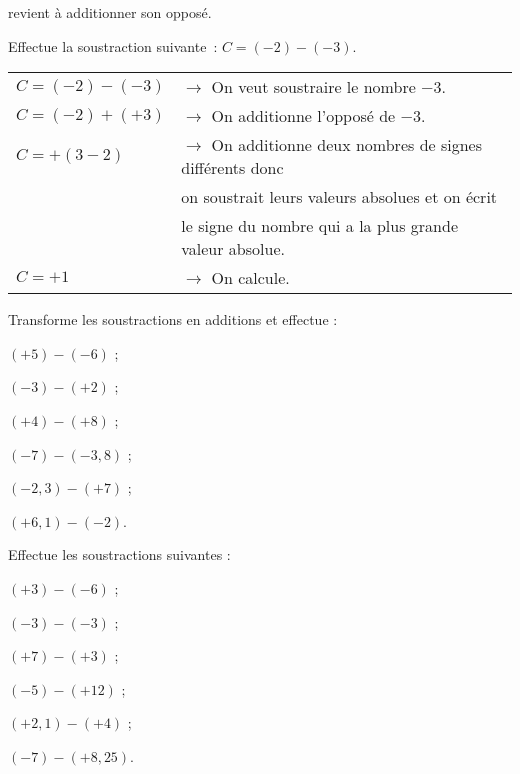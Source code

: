 \begin{methode*1}
 \end{methode*1}


\begin{methode*1}

\begin{aconnaitre}
 revient à additionner son opposé.
\end{aconnaitre}

 \begin{exemple*1}
Effectue la soustraction suivante : $C = (-2) - (-3)$.
\begin{tabular}{ll} 
$C = (-2) - (-3)$ & $\rightarrow$ On veut soustraire le nombre $-3$. \\
$C = (-2) + (+3)$ & $\rightarrow$ On additionne l'opposé de $-3$. \\
$C = + (3 - 2)$ & $\rightarrow$ On additionne deux nombres de signes différents donc \\
 & \phantom{$\rightarrow$} on soustrait leurs valeurs absolues et on écrit \\
 & \phantom{$\rightarrow$} le signe du nombre qui a la plus grande valeur absolue. \\
$C = +1$ & $\rightarrow$ On calcule. \\
\end{tabular}
 \end{exemple*1}

\exercice
Transforme les soustractions en additions et effectue :
\begin{colenumerate}{2}
 \item $(+5) - (-6)$ ;
 \item $(-3) - (+2)$ ;
 \item $(+4) - (+8)$ ;
 \item $(-7) - (-3,8)$ ;
 \item $(-2,3) - (+7)$ ;
 \item $(+6,1) - (-2)$.
 \end{colenumerate}

\exercice
Effectue les soustractions suivantes :
\begin{colenumerate}{2}
 \item $(+3) - (-6)$ ;
 \item $(-3) - (-3)$ ;
 \item $(+7) - (+3)$ ;
 \item $(-5) - (+12)$ ;
 \item $(+2,1) - (+4)$ ;
 \item $(-7) - (+8,25)$.
 \end{colenumerate}

 \end{methode*1}
 
